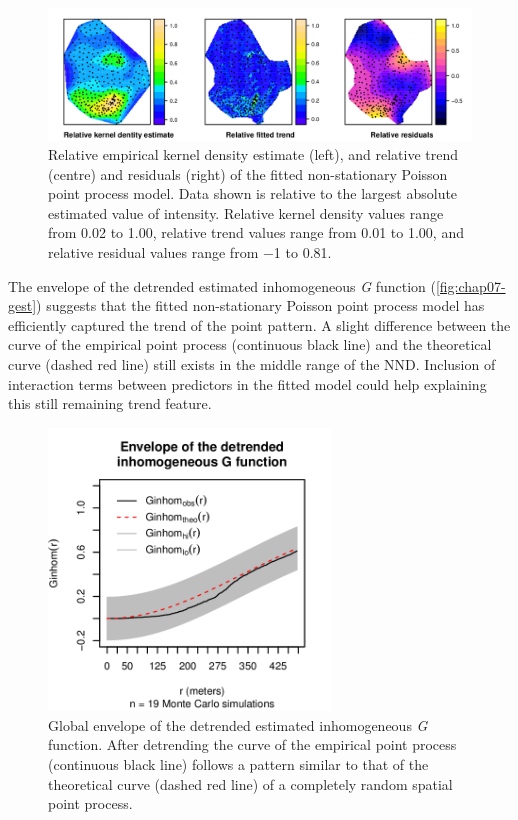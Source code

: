 \begin{figure}[!h]
 \centering
 \includegraphics[width=\textwidth]{fig/chap07-kernel-trend-res}

 \caption{Relative empirical kernel density estimate (left), and relative trend (centre) and residuals (right) 
 of the fitted non-stationary Poisson point process model. Data shown is relative to the largest absolute
 estimated value of intensity. Relative kernel density values range from \num{0.02} to \num{1.00}, relative
 trend values range from \num{0.01} to \num{1.00}, and relative residual values range from \num{-1} to
 \num{0.81}.}
 \label{fig:chap07-trend}
\end{figure}

The envelope of the detrended estimated inhomogeneous \emph{G} function (\autoref{fig:chap07-gest}) suggests 
that the fitted non-stationary Poisson point process model has efficiently captured the trend of the point 
pattern. A slight difference between the curve of the empirical point process (continuous black line) and the 
theoretical curve (dashed red line) still exists in the middle range of the NND. Inclusion of interaction terms 
between predictors in the fitted model could help explaining this still 
remaining trend feature.

\begin{figure}[!h]
 \centering
 \includegraphics[trim=0mm 0mm 0mm 12mm,clip=true,width=7.5cm]{fig/chap07-fit-gest-sim}

 \caption{Global envelope of the detrended estimated inhomogeneous \emph{G} function. After detrending the 
curve of the 
 empirical point process (continuous black line) follows a pattern similar to that of the theoretical curve 
 (dashed red line) of a completely random spatial point process.}
 \label{fig:chap07-trend}
\end{figure}

